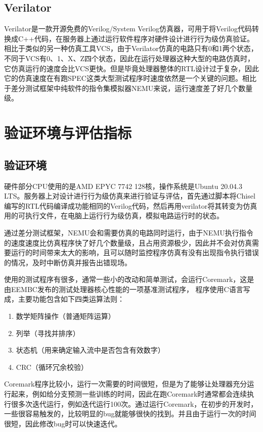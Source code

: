 \subsection{Verilator}

Verilator是一款开源免费的Verilog/System Verilog仿真器，可用于将Verilog代码转换成C++代码，在服务器上通过运行软件程序对硬件设计进行行为级仿真验证。相比于类似的另一种仿真工具VCS，由于Verilator仿真的电路只有0和1两个状态，不同于VCS有0、1、X、Z四个状态，因此在运行处理器这种大型的电路仿真时，它仿真运行的速度会比VCS更快。但是毕竟处理器整体的RTL设计过于复杂，因此它的仿真速度在有跑SPEC这类大型测试程序时速度依然是一个关键的问题。相比于差分测试框架中纯软件的指令集模拟器NEMU来说，运行速度差了好几个数量级。

\section{验证环境与评估指标}

\subsection{验证环境}

硬件部分CPU使用的是AMD EPYC 7742 128核，操作系统是Ubuntu 20.04.3 LTS。服务器上对设计进行行为级仿真来进行验证与评估，首先通过脚本将Chisel编写的RTL代码编译成功能相同的Verilog代码，然后再用verilator将其转变为仿真用的可执行文件，在电脑上运行行为级仿真，模拟电路运行时的状态。

通过差分测试框架，NEMU会和需要仿真的电路同时运行，由于NEMU执行指令的速度速度比仿真程序快了好几个数量级，且占用资源极少，因此并不会对仿真需要运行的时间带来太大的影响，且可以随时监控程序仿真有没有出现指令执行错误的情况，及时中断仿真并报告出错现场。

使用的测试程序有很多，通常一些小的改动和简单测试，会运行Coremark，这是由EEMBC发布的测试处理器核心性能的一项基准测试程序，
程序使用C语言写成，主要功能包含如下四类运算法则：

\begin{enumerate}
	\item 数学矩阵操作（普通矩阵运算）
	\item 列举（寻找并排序）
	\item 状态机（用来确定输入流中是否包含有效数字）
	\item CRC（循环冗余校验）
\end{enumerate}

Coremark程序比较小，运行一次需要的时间很短，但是为了能够让处理器充分运行起来，例如给分支预测一些训练的时间，因此在跑Coremark时通常都会连续执行很多次迭代运行，例如迭代运行100次。通过运行Coremark，在初步的开发时，一些很容易触发的，比较明显的bug就能够很快的找到。并且由于运行一次的时间很短，因此修改bug时可以快速迭代。

